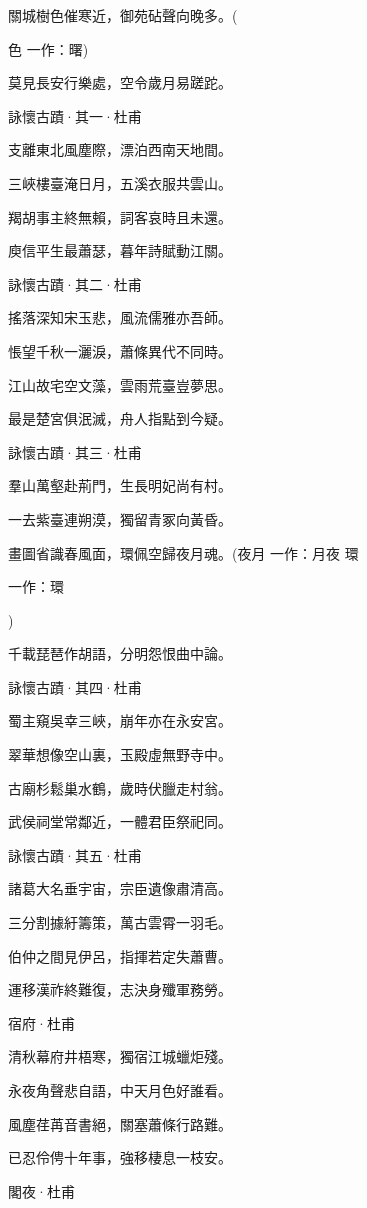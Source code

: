 \documentclass[12pt,a4paper]{ctexbook}
\begin{document}
關城樹色催寒近，御苑砧聲向晚多。(\par
色 一作：曙)\par
莫見長安行樂處，空令歲月易蹉跎。\par
詠懷古蹟·其一·杜甫\par
支離東北風塵際，漂泊西南天地間。\par
三峽樓臺淹日月，五溪衣服共雲山。\par
羯胡事主終無賴，詞客哀時且未還。\par
庾信平生最蕭瑟，暮年詩賦動江關。\par
詠懷古蹟·其二·杜甫\par
搖落深知宋玉悲，風流儒雅亦吾師。\par
悵望千秋一灑淚，蕭條異代不同時。\par
江山故宅空文藻，雲雨荒臺豈夢思。\par
最是楚宮俱泯滅，舟人指點到今疑。\par
詠懷古蹟·其三·杜甫\par
羣山萬壑赴荊門，生長明妃尚有村。\par
一去紫臺連朔漠，獨留青冢向黃昏。\par
畫圖省識春風面，環佩空歸夜月魂。(夜月 一作：月夜 環\par
一作：環\par
)\par
千載琵琶作胡語，分明怨恨曲中論。\par
詠懷古蹟·其四·杜甫\par
蜀主窺吳幸三峽，崩年亦在永安宮。\par
翠華想像空山裏，玉殿虛無野寺中。\par
古廟杉鬆巢水鶴，歲時伏臘走村翁。\par
武侯祠堂常鄰近，一體君臣祭祀同。\par
詠懷古蹟·其五·杜甫\par
諸葛大名垂宇宙，宗臣遺像肅清高。\par
三分割據紆籌策，萬古雲霄一羽毛。\par
伯仲之間見伊呂，指揮若定失蕭曹。\par
運移漢祚終難復，志決身殲軍務勞。\par
宿府·杜甫\par
清秋幕府井梧寒，獨宿江城蠟炬殘。\par
永夜角聲悲自語，中天月色好誰看。\par
風塵荏苒音書絕，關塞蕭條行路難。\par
已忍伶俜十年事，強移棲息一枝安。\par
閣夜·杜甫\par
\end{document}

